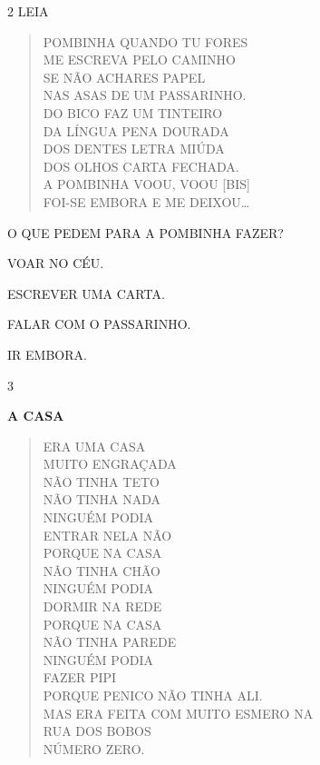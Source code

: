 
\num{2} LEIA

\begin{verse}
POMBINHA QUANDO TU FORES\\
ME ESCREVA PELO CAMINHO\\
SE NÃO ACHARES PAPEL\\
NAS ASAS DE UM PASSARINHO.\\
DO BICO FAZ UM TINTEIRO\\
DA LÍNGUA PENA DOURADA\\
DOS DENTES LETRA MIÚDA\\
DOS OLHOS CARTA FECHADA.\\
A POMBINHA VOOU, VOOU [BIS]\\
FOI-SE EMBORA E ME DEIXOU\ldots{}
\end{verse}


O QUE PEDEM PARA A POMBINHA FAZER?

\begin{escolha}
\item VOAR NO CÉU.

\item ESCREVER UMA CARTA.

\item FALAR COM O PASSARINHO.

\item IR EMBORA. 
\end{escolha}


\num{3}

\textbf{A CASA}

\begin{verse}
ERA UMA CASA\\
MUITO ENGRAÇADA\\
NÃO TINHA TETO\\
NÃO TINHA NADA\\
NINGUÉM PODIA\\
ENTRAR NELA NÃO\\
PORQUE NA CASA\\
NÃO TINHA CHÃO\\
NINGUÉM PODIA\\
DORMIR NA REDE\\
PORQUE NA CASA\\
NÃO TINHA PAREDE\\
NINGUÉM PODIA\\
FAZER PIPI\\
PORQUE PENICO NÃO TINHA ALI.\\
MAS ERA FEITA COM MUITO ESMERO NA\\
RUA DOS BOBOS\\
NÚMERO ZERO.
\end{verse}

